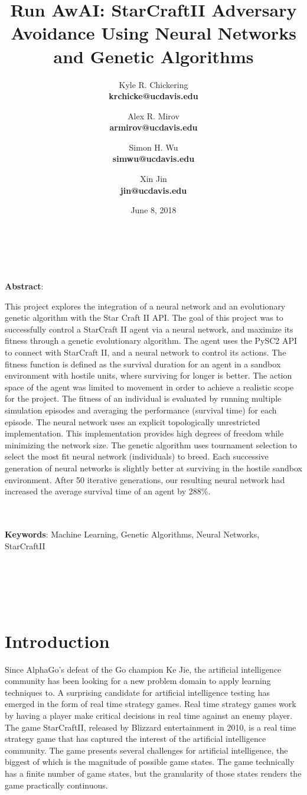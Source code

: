 \documentclass{article}
\title{Run AwAI: StarCraftII Adversary Avoidance Using Neural Networks and
  Genetic Algorithms}
\author{
    Kyle R. Chickering \\ {\footnotesize\textbf{krchicke@ucdavis.edu}}
    \and Alex R. Mirov \\ {\footnotesize\textbf{armirov@ucdavis.edu}}
    \and Simon H. Wu \\   {\footnotesize\textbf{simwu@ucdavis.edu}}
    \and Xin Jin \\       {\footnotesize\textbf{jin@ucdavis.edu}}
}
\date{June 8, 2018}
\renewenvironment{abstract}
{
\begin{changemargin}{0.5in}{0.5in}
}
{
\end{changemargin}
}
\begin{document}
\maketitle
\hline
\\~\\

\begin{abstract}
  \textbf{Abstract}: 

  This project explores the integration of a neural network and an evolutionary
  genetic algorithm with the Star Craft II API. The goal of this project was to
  successfully control a StarCraft II agent via a neural network, and maximize
  its fitness through a genetic evolutionary algorithm. The agent uses the PySC2
  API to connect with StarCraft II, and a neural network to control its
  actions. The fitness function is defined as the survival duration for an agent
  in a sandbox environment with hostile units, where surviving for longer is
  better. The action space of the agent was limited to movement in order to
  achieve a realistic scope for the project. The fitness of an individual is
  evaluated by running multiple simulation episodes and averaging the
  performance (survival time) for each episode. The neural network uses an
  explicit topologically unrestricted implementation. This implementation
  provides high degrees of freedom while minimizing the network size. The genetic
  algorithm uses tournament selection to select the most fit neural network
  (individuals) to breed. Each successive generation of neural networks is
  slightly better at surviving in the hostile sandbox environment. After 50
  iterative generations, our resulting neural network had increased the average
  survival time of an agent by 288\%.
  
  \\~\\
  \textbf{Keywords}: Machine Learning, Genetic Algorithms, Neural Networks,
  StarCraftII
\end{abstract}
\\~\\
\hline
\\~\\

\section{Introduction}
Since AlphaGo's defeat of the Go champion Ke Jie, the artificial intelligence
community has
been looking for a new problem domain to apply learning techniques to. A
surprising candidate for artificial intelligence testing has
emerged in the form of real time strategy games. Real time strategy games work
by having a player make critical decisions in real time against an enemy
player. The game StarCraftII, released by Blizzard entertainment in 2010, is a
real time strategy
game that has captured the interest of the artificial intelligence community.
The game presents several challenges for artificial intelligence, the biggest of
which is the magnitude of possible game states. The game technically has a
finite number of game states, but the granularity of those states renders the
game practically continuous.
\end{document}
